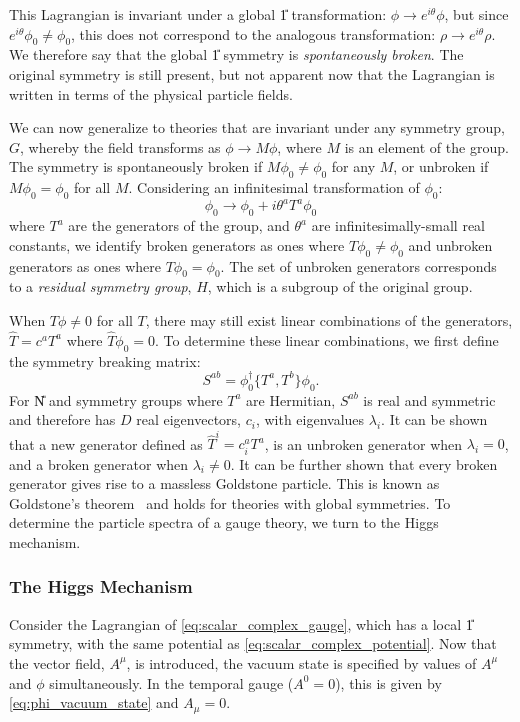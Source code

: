 This Lagrangian is invariant under a global \U{1} transformation: $\phi \to e^{i\theta} \phi$, but since $e^{i\theta}\phi_0 \neq \phi_0$, this does not correspond to the analogous transformation: $\rho \to e^{i\theta} \rho$. We therefore say that the global \U{1} symmetry is \textit{spontaneously broken}. The original symmetry is still present, but not apparent now that the Lagrangian is written in terms of the physical particle fields. 

We can now generalize to theories that are invariant under any symmetry group, $G$, whereby the field transforms as $\phi \to M \phi$, where $M$ is an element of the group. The symmetry is spontaneously broken if $M \phi_0 \neq \phi_0$ for any $M$, or unbroken if $M \phi_0 = \phi_0$ for all $M$. Considering an infinitesimal transformation of $\phi_0$:
\begin{equation}
  \phi_0 \to \phi_0 + i \theta^a T^a \phi_0
\end{equation}
where $T^a$ are the generators of the group, and $\theta^a$ are infinitesimally-small real constants, we identify broken generators as ones where $T \phi_0 \neq \phi_0$ and unbroken generators as ones where $T \phi_0 = \phi_0$. The set of unbroken generators corresponds to a \textit{residual symmetry group}, $H$, which is a subgroup of the original group. 

When $T \phi \neq 0$ for all $T$, there may still exist linear combinations of the generators, $\hat{T}=c^a T^a$ where $\hat{T} \phi_0 = 0$. To determine these linear combinations, we first define the symmetry breaking matrix:
\begin{equation}
  S^{ab} = \phi_0^\dag \{T^a, T^b\} \phi_0 .
  \label{eq:symmetry_breaking_matrix}
\end{equation}
For \U{N} and  symmetry groups where $T^a$ are Hermitian, $S^{ab}$ is real and symmetric and therefore has $D$ real eigenvectors, $c_i$, with eigenvalues $\lambda_i$. It can be shown that a new generator defined as $\hat{T}^i = c_i^a T^a$, is an unbroken generator when $\lambda_i = 0$, and a broken generator when $\lambda_i \neq 0$. It can be further shown that every broken generator gives rise to a massless Goldstone particle. This is known as Goldstone's theorem~\cite{Goldstone:1962es} and holds for theories with global symmetries. To determine the particle spectra of a gauge theory, we turn to the Higgs mechanism.

\subsubsection{The Higgs Mechanism}
Consider the Lagrangian of \cref{eq:scalar_complex_gauge}, which has a local \U{1} symmetry, with the same potential as \cref{eq:scalar_complex_potential}. Now that the vector field, $A^\mu$, is introduced, the vacuum state is specified by values of $A^\mu$ and $\phi$ simultaneously. In the temporal gauge ($A^0 = 0$), this is given by \cref{eq:phi_vacuum_state} and $A_\mu = 0$.
  
